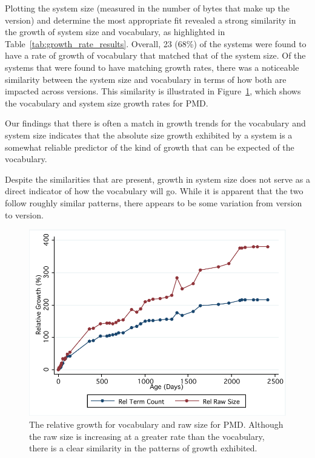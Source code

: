 Plotting the system size (measured in the number of bytes that make up the version) and determine the most appropriate fit revealed a strong similarity in the growth of system size and vocabulary, as highlighted in Table~\ref{tab:growth_rate_results}. Overall, 23 (68\%) of the systems were found to have a rate of growth of vocabulary that matched that of the system size. Of the systems that were found to have matching growth rates, there was a noticeable similarity between the system size and vocabulary in terms of how both are impacted across versions. This similarity is illustrated in Figure~\ref{fig:comparative_growth_pmd}, which shows the vocabulary and system size growth rates for PMD.

% 	
% 	

Our findings that there is often a match in growth trends for the vocabulary and system size indicates that the absolute size growth exhibited by a system is a somewhat reliable predictor of the kind of growth that can be expected of the vocabulary.

Despite the similarities that are present, growth in system size does not serve as a direct indicator of how the vocabulary will go. While it is apparent that the two follow roughly similar patterns, there appears to be some variation from version to version.

\begin{figure}[t]
\centering
\includegraphics[width=\textwidth]{Figures/Vocab-PMDComparativeGrowth.pdf}
\caption{The relative growth for vocabulary and raw size for PMD. Although the raw size is increasing at a greater rate than the vocabulary, there is a clear similarity in the patterns of growth exhibited.}
\label{fig:comparative_growth_pmd}
\end{figure}

